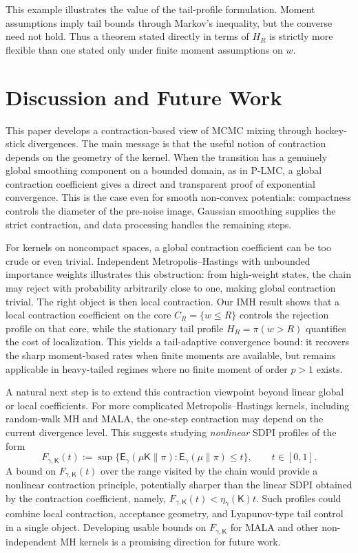 \documentclass[10pt, journal]{IEEEtran}
\newcommand{\sK}{\mathsf{K}}
\begin{document}
This example illustrates the value of the tail-profile formulation. Moment assumptions imply tail bounds through Markov's inequality, but the converse need not hold. Thus a theorem stated directly in terms of $H_R$ is strictly more flexible than one stated only under finite moment assumptions on $w$.


\section{Discussion and Future Work}
\label{sec:discussion}

This paper develops a contraction-based view of MCMC mixing through hockey-stick divergences. The main message is that the useful notion of contraction depends on the geometry of the kernel. When the transition has a genuinely global smoothing component on a bounded domain, as in P-LMC, a global contraction coefficient gives a direct and transparent proof of exponential convergence. This is the case even for smooth non-convex potentials: compactness controls the diameter of the pre-noise image, Gaussian smoothing supplies the strict contraction, and data processing handles the remaining steps.

For kernels on noncompact spaces, a global contraction coefficient can be too crude or even trivial. Independent Metropolis--Hastings with unbounded importance weights illustrates this obstruction: from high-weight states, the chain may reject with probability arbitrarily close to one, making global contraction trivial. The right object is then local contraction. Our IMH result shows that a local contraction coefficient on the core $C_R=\{w\le R\}$ controls the rejection profile on that core, while the stationary tail profile $H_R=\pi(w>R)$ quantifies the cost of localization. This yields a tail-adaptive convergence bound: it recovers the sharp moment-based rates when finite moments are available, but remains applicable in heavy-tailed regimes where no finite moment of order $p>1$ exists.

A natural next step is to extend this contraction viewpoint beyond linear global or local coefficients. For more complicated Metropolis--Hastings kernels, including random-walk MH and MALA, the one-step contraction may depend on the current divergence level. This suggests studying \textit{nonlinear} SDPI profiles of the form
$$F_{\gamma,\sK}(t):=\sup\{\mathsf E_\gamma(\mu\sK\|\pi):\mathsf E_\gamma(\mu\|\pi)\le t\},\qquad t\in[0,1].$$
A bound on $F_{\gamma,\sK}(t)$ over the range visited by the chain would provide  a nonlinear contraction principle, potentially sharper than the linear SDPI obtained by the contraction coefficient, namely, $F_{\gamma,\sK}(t)<\eta_\gamma(\sK) t$. Such profiles could combine local contraction, acceptance geometry, and Lyapunov-type tail control in a single object. Developing usable bounds on $F_{\gamma,\sK}$ for MALA and other non-independent MH kernels is a promising direction for future work.
\end{document}
